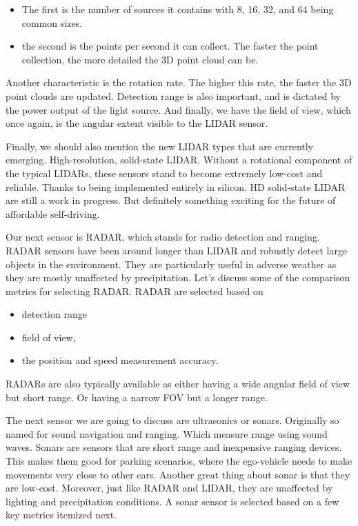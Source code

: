 \begin{itemize}

\item The first is the number of sources it contains with 8, 16, 32, and 64 being common sizes. 
\item the second is the points per second it can collect. The faster the point collection, the more
detailed the 3D point cloud can be. 
\end{itemize}

Another characteristic is the rotation rate. The higher this rate, the faster
the 3D point clouds are updated. Detection range is also important, and is dictated by the power
output of the light source. And finally, we have the field of view,
which once again, is the angular extent
visible to the LIDAR sensor. 

Finally, we should also mention the new
LIDAR types that are currently emerging. High-resolution, solid-state LIDAR. Without a rotational component
of the typical LIDARs, these sensors stand to become
extremely low-cost and reliable. Thanks to being implemented
entirely in silicon. HD solid-state LIDAR
are still a work in progress. But definitely something exciting for
the future of affordable self-driving. 


Our next sensor is RADAR, which stands for radio detection and ranging. RADAR sensors have been
around longer than LIDAR and robustly detect large
objects in the environment. They are particularly useful in adverse
weather as they are mostly unaffected by precipitation. Let's discuss some of the comparison
metrics for selecting RADAR. RADAR are selected based on

\begin{itemize}
\item detection range
\item field of view, 
\item the position and speed measurement accuracy. 
\end{itemize}

RADARs are also typically available as either having a wide angular field of view but short range. 
Or having a narrow FOV but a longer range. 

The next sensor we are going to discuss are ultrasonics or sonars. Originally so named for
sound navigation and ranging. Which measure range using sound waves. Sonars are sensors that are short
range and inexpensive ranging devices. This makes them good for parking scenarios, where the ego-vehicle needs to make
movements very close to other cars. Another great thing about sonar is that they are low-cost. Moreover, just like RADAR and LIDAR,
they are unaffected by lighting and precipitation conditions. A sonar sensor is selected based
on a few key metrics itemized next. 

